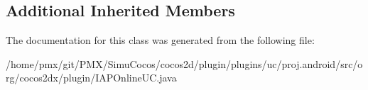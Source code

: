 \subsection*{Additional Inherited Members}


The documentation for this class was generated from the following file\+:\begin{DoxyCompactItemize}
\item 
/home/pmx/git/\+P\+M\+X/\+Simu\+Cocos/cocos2d/plugin/plugins/uc/proj.\+android/src/org/cocos2dx/plugin/I\+A\+P\+Online\+U\+C.\+java\end{DoxyCompactItemize}
